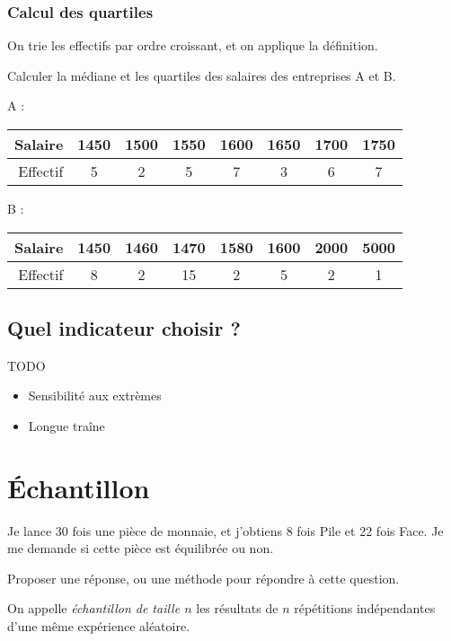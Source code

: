\subsubsection{Calcul des quartiles}

On trie les effectifs par ordre croissant, et on applique la définition.

\begin{exemple}
Calculer la médiane et les quartiles des salaires des entreprises A et B.

  A :
  \begin{tabular}{r|c|c|c|c|c|c|c}
    Salaire  & 1450 & 1500 & 1550 & 1600 & 1650 & 1700 & 1750 \\
    \hline
    Effectif & 5    &  2   &  5   &  7   &  3   &  6   & 7    \\
  \end{tabular}

  B :
  \begin{tabular}{r|c|c|c|c|c|c|c}
    Salaire  & 1450 & 1460 & 1470 & 1580 & 1600 & 2000 & 5000 \\
    \hline
    Effectif & 8    &  2   & 15   &  2   &  5   &  2   & 1    \\
  \end{tabular}
\end{exemple}

\subsection{Quel indicateur choisir ?}

TODO

\begin{itemize}
  \item Sensibilité aux extrèmes
  \item Longue traîne
\end{itemize}

\section{Échantillon}

\begin{activite}
  Je lance 30 fois une pièce de monnaie, et j'obtiens 8 fois Pile et 22 fois Face. Je me demande si cette pièce est équilibrée ou non.

  Proposer une réponse, ou une méthode pour répondre à cette question.
\end{activite}


\begin{definition}
  On appelle \emph{échantillon de taille $n$} les résultats de $n$ répétitions indépendantes d'une même expérience aléatoire.
\end{definition}

